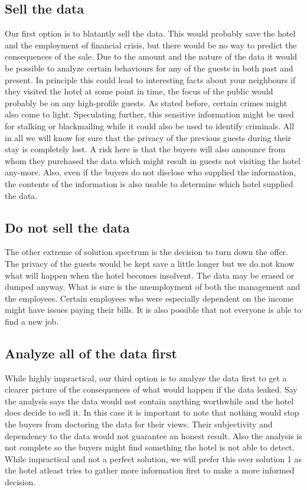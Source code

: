 \subsection{Sell the data}
Our first option is to blatantly sell the data. This would probably save the hotel and the employment of financial crisis, but there would be no way to predict the consequences of the sale. Due to the amount and the nature of the data it would be possible to analyze certain behaviours for any of the guests in both past and present. In principle this could lead to interesting facts about your neighbours if they visited the hotel at some point in time, the focus of the public would probably be on any high-profile guests. As stated before, certain crimes might also come to light. Speculating further, this sensitive information might be used for stalking or blackmailing while it could also be used to identify criminals. All in all we will know for sure that the privacy of the previous guests during their stay is completely lost. A risk here is that the buyers will also announce from whom they purchased the data which might result in guests not visiting the hotel any-more. Also, even if the buyers do not disclose who supplied the information, the contents of the information is also usable to determine which hotel supplied the data.

\subsection{Do not sell the data}
The other extreme of solution spectrum is the decision to turn down the offer. The privacy of the guests would be kept save a little longer but we do not know what will happen when the hotel becomes insolvent. The data may be erased or dumped anyway. What is sure is the unemployment of both the management and the employees. Certain employees who were especially dependent on the income might have issues paying their bills. It is also possible that not everyone is able to find a new job. 

\subsection{Analyze all of the data first}
While highly impractical, our third option is to analyze the data first to get a clearer picture of the consequences of what would happen if the data leaked. Say the analysis says the data would not contain anything worthwhile and the hotel does decide to sell it. In this case it is important to note that nothing would stop the buyers from doctoring the data for their views. Their subjectivity and dependency to the data would not guarantee an honest result. Also the analysis is not complete so the buyers might find something the hotel is not able to detect. While impractical and not a perfect solution, we will prefer this over solution 1 as the hotel atleast tries to gather more information first to make a more informed decision.

